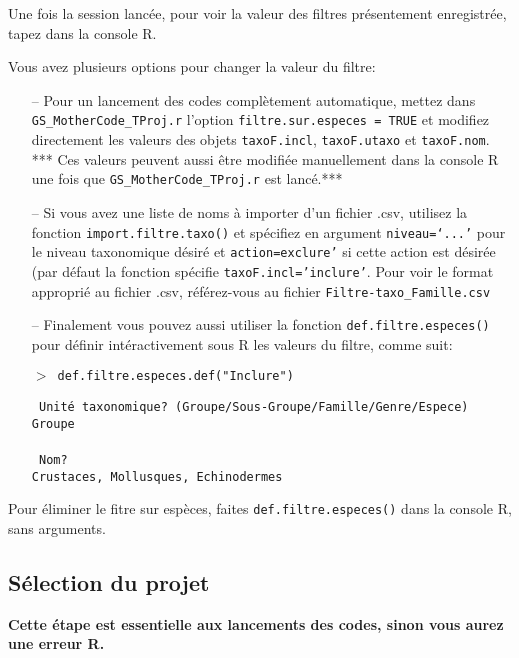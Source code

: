 \documentclass{article}
\newcommand{\mcode} {\texttt{GS\_MotherCode\_TProj.r}{ }}
\begin{document}
Une fois la session lancée, pour voir la valeur des filtres
présentement enregistrée, tapez  dans la
console R.

Vous avez plusieurs options pour changer la valeur du filtre:

\begin{itemize}
\item[--] Pour un lancement des codes complètement automatique, mettez dans
\mcode l'option \texttt{filtre.sur.especes =  TRUE} et modifiez
directement les valeurs des objets
\texttt{taxoF.incl}, \texttt{taxoF.utaxo} et \texttt{taxoF.nom}. *** Ces
valeurs peuvent aussi être modifiée manuellement dans la console R une
fois que \mcode{} est lancé.***
\item[--] \label{impFtaxo}Si vous avez une liste de noms à importer
d'un fichier .csv, utilisez la fonction \texttt{import.filtre.taxo()}
et spécifiez en argument \texttt{niveau=`...'} pour le niveau
taxonomique désiré et \texttt{action=exclure'} si cette action est
désirée (par défaut la fonction spécifie
\texttt{taxoF.incl='inclure'}. Pour voir le format approprié au
fichier .csv, référez-vous au fichier \texttt{Filtre-taxo\_Famille.csv}
\item[--] Finalement vous pouvez aussi utiliser
la fonction \texttt{def.filtre.especes()} pour définir intéractivement
sous R les valeurs du filtre, comme suit:


\texttt{$>$ def.filtre.especes.def("Inclure")}

\indent \texttt{\color{MidnightBlue} Unité taxonomique? (Groupe/Sous-Groupe/Famille/Genre/Espece)} \\
\indent \indent \texttt{Groupe}\\
\\
\indent \texttt{\color{MidnightBlue} Nom?} \\
\indent \indent \texttt{Crustaces, Mollusques, Echinodermes}\\
\end{itemize}

Pour éliminer le fitre sur espèces, faites
\texttt{def.filtre.especes()} dans la console R, sans arguments.

\subsection{Sélection du projet}

\ra \textbf{Cette étape est essentielle aux lancements des codes, sinon vous
aurez une erreur R.}\\
\end{document}
